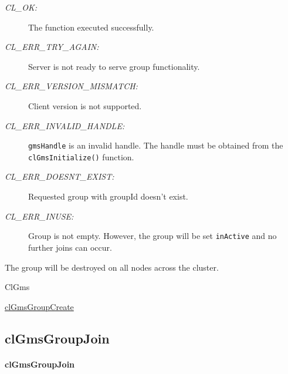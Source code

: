 \begin{flushleft}
   \begin{Desc}
   \item[Return values:]
   \begin{description}
   \item[{\em CL\_\-OK:}]The function executed successfully.
  \item[{\em CL\_\-ERR\_\-TRY\_\-AGAIN:}] Server is not ready to serve group functionality.
      \item[{\em CL\_\-ERR\_\-VERSION\_\-MISMATCH:}] Client version is not supported.
     \item[{\em CL\_\-ERR\_\-INVALID\_\-HANDLE:}] {\tt{gmsHandle}} is an invalid handle. The handle must be obtained from the
{\tt{clGmsInitialize()}} function. 
     \item[{\em CL\_\-ERR\_\-DOESNT\_\-EXIST:}] Requested group with groupId doesn't exist.
     \item[{\em CL\_\-ERR\_\-INUSE:}] Group is not empty. However, the group will be set {\tt{inActive}} and 
                                no further joins can occur.

    \end{description}
     \end{Desc}

    \begin{Desc}
    \item[Description:]

The group will be destroyed on all nodes
 across the cluster. \end{Desc}
   \begin{Desc}
  \item[Library File:]Cl\-Gms\end{Desc}
  \begin{Desc}
  \item[Related Function(s):] \hyperlink{pagegms110}{clGmsGroupCreate}
  \end{Desc}




   \newpage
    \subsection{clGmsGroupJoin}
  \hypertarget{pagegms112}{}\paragraph{cl\-Gms\-Group\-Join}\label{pagegms112}
    \begin{Desc}


\end{Desc}
\end{flushleft}
